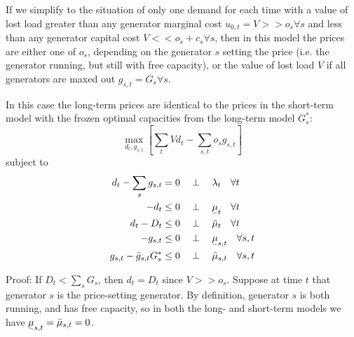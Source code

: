 \documentclass[final,3p]{elsarticle}
\def\l{\lambda} \def\K{\kappa} \def\m{\mu} \def\G{\Gamma} \def\d{\partial}
\begin{document}
If we simplify to the situation of only one demand for each time with a value of
lost load greater than any generator marginal cost $u_{0,t} = V >> o_s \forall
s$ and less than any generator capital cost $V << o_s + c_s \forall s$, then in
this model the prices are either one of $o_s$, depending on the generator $s$
setting the price (i.e. the generator running, but still with free capacity), or
the value of lost load $V$ if all generators are maxed out $g_{s,t} = G_s
\forall s$.

In this case the long-term prices are identical to the prices in the short-term
model with the frozen optimal capacities from the long-term model $G_{s}^*$:
\begin{equation}
  \max_{d_{t}, g_{s,t}}\left[\sum_{t} V d_{t}  - \sum_{s,t} o_{s} g_{s,t} \right]  \label{eq:objs}
\end{equation}
subject to
\begin{align}
  d_{t} - \sum_s g_{s,t}        & =  0 \hspace{0.34cm}\perp \hspace{0.34cm} \l_t \hspace{0.34cm} \forall t \label{eq:balance2}                  \\
  -d_{t}                        & \leq 0 \hspace{0.34cm}\perp \hspace{0.34cm} \ubar{\mu}_{t} \hspace{0.34cm} \forall t  \nonumber               \\
  d_{t} - D_{t}                 & \leq 0 \hspace{0.34cm}\perp \hspace{0.34cm} \bar{\mu}_{t} \hspace{0.34cm} \forall t\nonumber                  \\
  -g_{s,t}                      & \leq 0 \hspace{0.34cm}\perp \hspace{0.34cm} \ubar{\mu}_{s,t} \hspace{0.34cm} \forall s,t \nonumber            \\
  g_{s,t} - \bar{g}_{s,t} G^*_s & \leq 0 \hspace{0.34cm}\perp \hspace{0.34cm} \bar{\mu}_{s,t} \hspace{0.34cm} \forall s,t \label{eq:generation}
\end{align}

Proof: If $D_t < \sum_s G_{s}$, then $d_t = D_t$ since $V >> o_s$. Suppose at
time $t$ that generator $s$ is the price-setting generator. By definition,
generator $s$ is both running, and has free capacity, so in both the long- and
short-term models we have $\ubar{\mu}_{s,t} = \bar{\mu}_{s,t} = 0$.
\end{document}
